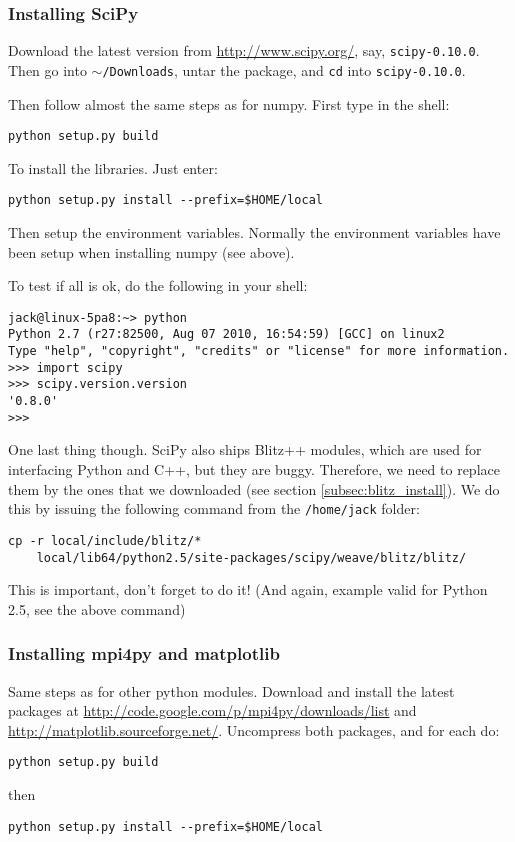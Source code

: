 \documentclass[a4paper,10pt]{book}
\begin{document}
\subsubsection{Installing SciPy}
%
\par
Download the latest version from \url{http://www.scipy.org/}, say, \texttt{scipy-0.10.0}. Then go into \texttt{$\sim$/Downloads}, untar the package, and \texttt{cd} into \texttt{scipy-0.10.0}.
%
\par
Then follow almost the same steps as for numpy. First type in the shell:
\begin{verbatim}
python setup.py build
\end{verbatim}
%
\par
To install the libraries. Just enter:
\begin{verbatim}
python setup.py install --prefix=$HOME/local
\end{verbatim}
%
\par
Then setup the environment variables. Normally the environment variables have been setup when installing numpy (see above).
%
\par
To test if all is ok, do the following in your shell:
\begin{verbatim}
jack@linux-5pa8:~> python
Python 2.7 (r27:82500, Aug 07 2010, 16:54:59) [GCC] on linux2
Type "help", "copyright", "credits" or "license" for more information.
>>> import scipy
>>> scipy.version.version
'0.8.0'
>>> 
\end{verbatim}
%
\par
One last thing though. SciPy also ships Blitz++ modules, which are used for interfacing Python and C++, but they are buggy. Therefore, we need to replace them by the ones that we downloaded (see section \ref{subsec:blitz_install}).
We do this by issuing the following command from the \texttt{/home/jack} folder:
\begin{verbatim}
cp -r local/include/blitz/* 
    local/lib64/python2.5/site-packages/scipy/weave/blitz/blitz/
\end{verbatim}
This is important, don't forget to do it! (And again, example valid for Python 2.5, see the above command)


\subsubsection{Installing mpi4py and matplotlib}
%
\par
Same steps as for other python modules. Download and install the latest packages at \url{http://code.google.com/p/mpi4py/downloads/list} and \url{http://matplotlib.sourceforge.net/}. Uncompress both packages, and for each do:
\begin{verbatim}
python setup.py build
\end{verbatim}
then
\begin{verbatim}
python setup.py install --prefix=$HOME/local
\end{verbatim}
\end{document}
